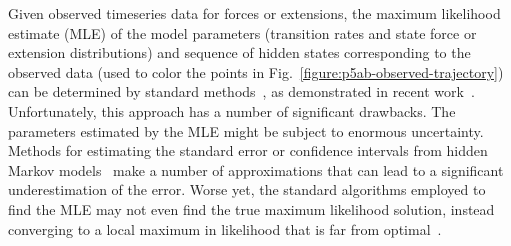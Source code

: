 \documentclass[aps,pre,twocolumn,superscriptaddress,nofootinbib,longbibliography]{revtex4-1}
\begin{document}
{Given observed timeseries data for forces or extensions, the maximum likelihood estimate (MLE) of the model parameters (transition rates and state force or extension distributions) and sequence of hidden states corresponding to the observed data {\color{red} (used to color the points in Fig.~\ref{figure:p5ab-observed-trajectory})} can be determined by standard methods~\cite{baum:1970:ann-math-statist:baum-welch,viterbi:1967:IEEE-trans-info-theory:viterbi-algorithm}, as demonstrated in recent work~\cite{kruithof-vannoort:biophys-j:2009:hmm-force}.
Unfortunately, this approach has a number of significant drawbacks.
{\color{magenta}The parameters estimated by the MLE might be subject to enormous uncertainty. 
Methods for estimating the standard error or confidence intervals from hidden Markov models~\cite{aittokallio-uusipaikka:technical-report:2000:hmm-standard-error} make a number of approximations that can lead to a significant underestimation of the error.}
Worse yet, the standard algorithms employed to find the MLE may not even find the true maximum likelihood solution, instead converging to a local maximum in likelihood that is far from optimal~\cite{merialdo:ieee-trans-speech-audio-proc:1993:baum-welch-localit}.

}
\end{document}
